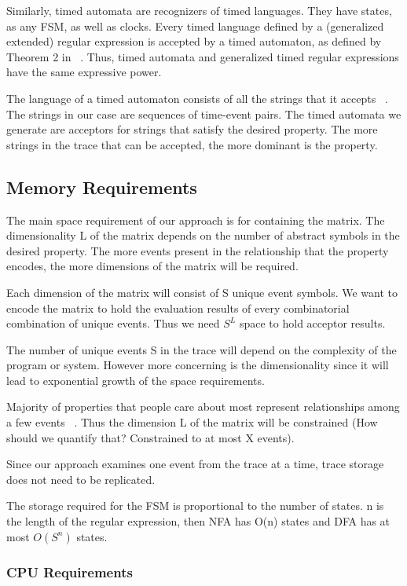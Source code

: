 \documentclass[]{sigplanconf}
\begin{document}
Similarly, timed automata are recognizers of timed languages. They have states, as any FSM, as well as clocks. Every timed language defined by a (generalized extended) regular expression is accepted by a timed automaton, as defined by Theorem 2 in ~\cite{timedregex}. Thus, timed automata and generalized timed regular expressions have the same expressive power. 

The language of a timed automaton consists of all the strings that it accepts ~\cite{timedregex}. The strings in our case are sequences of time-event pairs. The timed automata we generate are acceptors for strings that satisfy the desired property. The more strings in the trace that can be accepted, the more dominant is the property.

\subsection{Memory Requirements}

The main space requirement of our approach is for containing the matrix. The dimensionality L of the matrix depends on the number of abstract symbols in the desired property. The more events present in the relationship that the property encodes, the more dimensions of the matrix will be required. 

Each dimension of the matrix will consist of S unique event symbols. We want to encode the matrix to hold the evaluation results of every combinatorial combination of unique events. Thus we need $S^L$ space to hold acceptor results.

The number of unique events S in the trace will depend on the complexity of the program or system. However more concerning is the dimensionality since it will lead to exponential growth of the space requirements.

Majority of properties that people care about most represent relationships among a few events ~\cite{evans1, dwyer}. Thus the dimension L of the matrix will be constrained (How should we quantify that? Constrained to at most X events).

Since our approach examines one event from the trace at a time, trace storage does not need to be replicated.

The storage required for the FSM is proportional to the number of states. n is the length of the regular expression, then NFA has O(n) states and DFA has at most $O(S^n)$ states.

\subsubsection{CPU Requirements}
\end{document}
